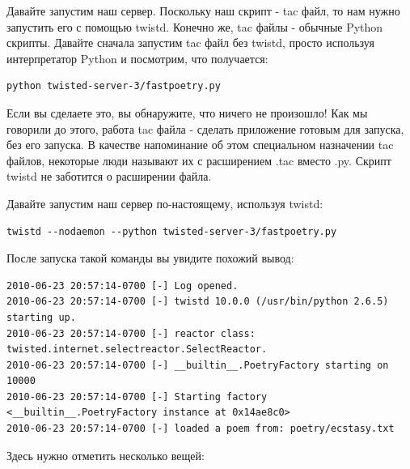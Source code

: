 Давайте запустим наш сервер. 
Поскольку наш скрипт - tac файл, то нам нужно запустить его с помощью twistd.  
Конечно же, tac файлы - обычные Python скрипты. 
Давайте сначала запустим tac файл без twistd, 
просто используя интерпретатор Python и посмотрим, что получается:

\begin{scriptsize}\begin{verbatim}
python twisted-server-3/fastpoetry.py
\end{verbatim}\end{scriptsize}


Если вы сделаете это, вы обнаружите, что ничего не произошло! 
Как мы говорили до этого, работа tac файла - сделать приложение 
готовым для запуска, без его запуска. В качестве напоминание об этом 
специальном назначении tac файлов, некоторые люди называют их с 
расширением .tac вместо .py. Скрипт twistd не заботится о 
расширении файла.


Давайте запустим наш сервер по-настоящему, используя twistd:

\begin{scriptsize}\begin{verbatim}
twistd --nodaemon --python twisted-server-3/fastpoetry.py
\end{verbatim}\end{scriptsize}


После запуска такой команды вы увидите похожий вывод:

\begin{scriptsize}\begin{verbatim}
2010-06-23 20:57:14-0700 [-] Log opened.
2010-06-23 20:57:14-0700 [-] twistd 10.0.0 (/usr/bin/python 2.6.5) starting up.
2010-06-23 20:57:14-0700 [-] reactor class: twisted.internet.selectreactor.SelectReactor.
2010-06-23 20:57:14-0700 [-] __builtin__.PoetryFactory starting on 10000
2010-06-23 20:57:14-0700 [-] Starting factory <__builtin__.PoetryFactory instance at 0x14ae8c0>
2010-06-23 20:57:14-0700 [-] loaded a poem from: poetry/ecstasy.txt
\end{verbatim}\end{scriptsize}

Здесь нужно отметить несколько вещей:

